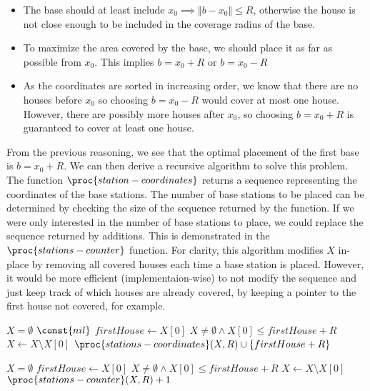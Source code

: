 \documentclass[a4paper, 10pt, twoside]{article}
\begin{document}
\begin{itemize}
	\item The base should at least include $x_0 \implies \Vert b - x_0 \Vert \leq R$, otherwise the house is not close enough to be included in the coverage radius of the base.
	\item To maximize the area covered by the base, we should place it as far as possible from $x_0$. This implies $b = x_0 + R$ or $b = x_0 - R$
	\item As the coordinates are sorted in increasing order, we know that there are no houses before $x_0$ so choosing $b = x_0 -R $ would cover at most one house. However, there are possibly more houses after $x_0$, so choosing $b = x_0 + R$ is guaranteed to cover at least one house.
\end{itemize}

From the previous reasoning, we see that the optimal placement of the first base is $b = x_0 + R$.  We can then derive a recursive algorithm to solve this problem. The function $\proc{station-coordinates}$ returns a sequence representing the coordinates of the base stations. The number of base stations to be placed can be determined by checking the size of the sequence returned by the function. If we were only interested in the number of base stations to place, we could replace the sequence returned by additions. This is demonstrated in the $\proc{stations-counter}$ function.
For clarity, this algorithm modifies $X$ in-place by removing all covered houses each time a base station is placed. However, it would be more efficient (implementaion-wise) to not modify the sequence and just keep track of which houses are already covered, by keeping a pointer to the first house not covered, for example.

\begin{codebox}
	\zi \If $X = \emptyset$
	\zi \Then \Return $\const{nil}$ \End
	\zi $firstHouse \gets X[0]$
	\zi \While $X \neq \emptyset \land X[0]  \leq firstHouse + R$
	\zi \Then $X \gets X \setminus X[0]$ \End
	\zi \Return $\proc{stations-coordinates}(X, R) \cup \{ firstHouse + R \}$ \End
\end{codebox}

\begin{codebox}
	\zi \If $X = \emptyset$
	\zi \Then {} \End
	\zi $firstHouse \gets X[0]$
	\zi \While $X \neq \emptyset \land X[0]  \leq firstHouse + R$
	\zi \Then $X \gets X \setminus X[0]$ \End
	\zi \Return $\proc{stations-counter}(X, R) + 1$ \End
\end{codebox}
\end{document}
